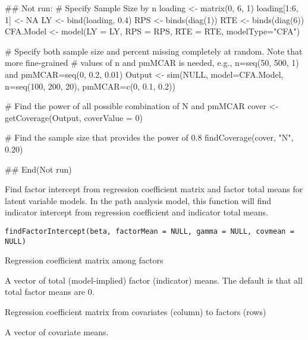 \documentclass[a4paper]{book}
\begin{document}
%
\begin{Examples}
\begin{ExampleCode}
## Not run: 
# Specify Sample Size by n
loading <- matrix(0, 6, 1)
loading[1:6, 1] <- NA
LY <- bind(loading, 0.4)
RPS <- binds(diag(1))
RTE <- binds(diag(6))
CFA.Model <- model(LY = LY, RPS = RPS, RTE = RTE, modelType="CFA")

# Specify both sample size and percent missing completely at random. Note that more fine-grained 
# values of n and pmMCAR is needed, e.g., n=seq(50, 500, 1) and pmMCAR=seq(0, 0.2, 0.01)
Output <- sim(NULL, model=CFA.Model, n=seq(100, 200, 20), pmMCAR=c(0, 0.1, 0.2))

# Find the power of all possible combination of N and pmMCAR
cover <- getCoverage(Output, coverValue = 0)

# Find the sample size that provides the power of 0.8
findCoverage(cover, "N", 0.20)

## End(Not run)
\end{ExampleCode}
\end{Examples}
%
\begin{Description}\relax
Find factor intercept from regression coefficient matrix and factor total means for latent variable models. In the path analysis model, this function will find indicator intercept from regression coefficient and indicator total means.
\end{Description}
%
\begin{Usage}
\begin{verbatim}
findFactorIntercept(beta, factorMean = NULL, gamma = NULL, covmean = NULL)
\end{verbatim}
\end{Usage}
%
\begin{Arguments}
\begin{ldescription}
\item[\code{beta}] 
Regression coefficient matrix among factors

\item[\code{factorMean}] 
A vector of total (model-implied) factor (indicator) means. The default is that all total factor means are 0.

\item[\code{gamma}] 
Regression coefficient matrix from covariates (column) to factors (rows)

\item[\code{covmean}] 
A vector of covariate means.

\end{ldescription}
\end{Arguments}
\end{document}
